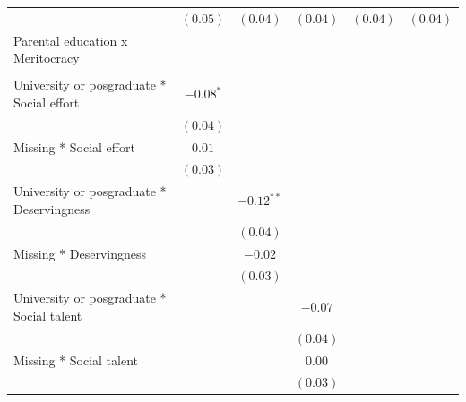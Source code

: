 \documentclass[
  12pt,
  letterpaper,
]{article}
\begin{document}
\begin{table}
{\begin{center}
{\begin{threeparttable}
\begin{tabular}{l c c c c c}
                                                    & $(0.05)$      & $(0.04)$      & $(0.04)$      & $(0.04)$      & $(0.04)$      \\
Parental education x Meritocracy                    &               &               &               &               &               \\
                                                    &               &               &               &               &               \\
\quad University or posgraduate * Social effort     & $-0.08^{*}$   &               &               &               &               \\
                                                    & $(0.04)$      &               &               &               &               \\
\quad Missing * Social effort                       & $0.01$        &               &               &               &               \\
                                                    & $(0.03)$      &               &               &               &               \\
\quad University or posgraduate * Deservingness     &               & $-0.12^{**}$  &               &               &               \\
                                                    &               & $(0.04)$      &               &               &               \\
\quad Missing * Deservingness                       &               & $-0.02$       &               &               &               \\
                                                    &               & $(0.03)$      &               &               &               \\
\quad University or posgraduate * Social talent     &               &               & $-0.07$       &               &               \\
                                                    &               &               & $(0.04)$      &               &               \\
\quad Missing * Social talent                       &               &               & $0.00$        &               &               \\
                                                    &               &               & $(0.03)$      &               &               \\

\end{tabular}
\end{threeparttable}}
\end{center}}
\end{table}
\end{document}
